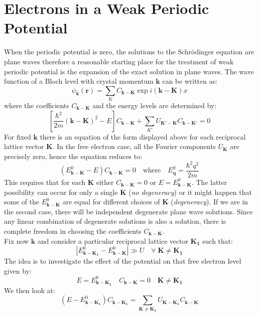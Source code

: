 \documentclass[10.75pt,a4paper,openright,bottom=2cm]{article}
\renewcommand{\Vec}[1]{\boldsymbol{#1}}
\begin{document}
\section{Electrons in a Weak Periodic Potential}
When the periodic potential is zero, the solutions to the Schr\"odinger equation are plane waves therefore a reasonable starting place for the treatment of weak periodic potential is the expansion of the exact solution in plane waves. The wave function of a Bloch level with crystal momentum $\Vec{k}$ can be written as:
\[
\psi_{\Vec{k}}(\Vec{r})=\sum_KC_{\Vec{k}-\Vec{K}}\exp{i(\Vec{k}-\Vec{K})x}
\]
where the coefficients $C_{\Vec{k}-\Vec{K}}$ and the energy levels are determined by:
\begin{equation}
\label{ckk}
\left[\frac{\hbar^2}{2m}(\Vec{k}-\Vec{K})^2-E\right]C_{\Vec{k}-\Vec{K}}+\sum_{K'}U_{\Vec{K'}-\Vec{K}}C_{\Vec{k}-\Vec{K'}}=0
\end{equation}
For fixed $\Vec{k}$ there is an equation of the form displayed above for each reciprocal lattice vector $\Vec{K}$. In the free electron case, all the Fourier components $U_{\Vec{K}}$ are precisely zero, hence the equation reduces to:
\[
(E^0_{\Vec{k}-\Vec{K}}-E)C_{\Vec{k}-\Vec{K}}=0 \quad \text{where} \quad E^0_{\Vec{q}}=\frac{\hbar^2q^2}{2m}
\]
This requires that for each $\Vec{K}$ either $C_{\Vec{k}-\Vec{K}}=0$ or $E=E^0_{\Vec{k}-\Vec{K}}$. The latter possibility can occur for only a single $\Vec{K}$ (\textit{no degeneracy}) or it might happen that some of the $E^0_{\Vec{k}-\Vec{K}}$ are equal for different choices of $\Vec{K}$ (\textit{degeneracy}). If we are in the second case, there will be independent degenerate plane wave solutions. Since any linear combination of degenerate solutions is also a solution, there is complete freedom in choosing the coefficients $C_{\Vec{k}-\Vec{K}}$.\\
Fix now $\Vec{k}$ and consider a particular reciprocal lattice vector $\Vec{K_1}$ such that:
\begin{equation}
\label{assumption}
|E^0_{\Vec{k}-\Vec{K_1}}-E^0_{\Vec{k}-\Vec{K}}|\gg U \quad \forall\;\Vec{K}\neq\Vec{K_1}
\end{equation}
The idea is to investigate the effect of the potential on that free electron level given by:
\[
E=E^0_{\Vec{k}-\Vec{K_1}} \quad C_{\Vec{k}-\Vec{K}}=0 \quad \Vec{K}\neq\Vec{K_1}
\]
We then look at:
\begin{equation}
\label{sub}
(E-E^0_{\Vec{k}-\Vec{K_1}})C_{\Vec{k}-\Vec{K_1}}=\sum_{\Vec{K}\neq\Vec{K_1}}U_{\Vec{K}-\Vec{K_1}}C_{\Vec{k}-\Vec{K}}
\end{equation}
\end{document}
